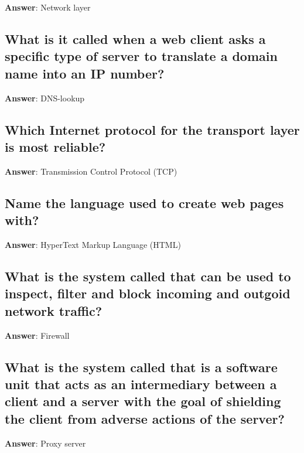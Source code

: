 \documentclass[a4paper,11pt,oneside]{article}
\begin{document}
\begin{sloppypar}
\label{q:24:sa:en:True}

\textbf{Answer}: Network layer



\subsection{What is it called when a web client asks a specific type of server to translate a domain name into an IP number?}

\label{q:25:sa:en:True}

\textbf{Answer}: DNS-lookup



\subsection{Which Internet protocol for the transport layer is most reliable?}

\label{q:26:sa:en:True}

\textbf{Answer}: Transmission Control Protocol (TCP)



\subsection{Name the language used to create web pages with?}

\label{q:27:sa:en:True}

\textbf{Answer}: HyperText Markup Language (HTML)



\subsection{What is the system called that can be used to inspect, filter and block incoming and outgoid network traffic?}

\label{q:28:sa:en:True}

\textbf{Answer}: Firewall



\subsection{What is the system called that is a software unit that acts as an intermediary between a client and a server with the goal of shielding the client from adverse actions of the server?}

\label{q:29:sa:en:True}

\textbf{Answer}: Proxy server




\end{sloppypar}
\end{document}
